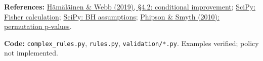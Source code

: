 \documentclass[10pt,a4paper]{article}
\begin{document}
{\footnotesize
\textbf{References:}
\href{https://link.springer.com/article/10.1007/s10618-018-0590-x}{H\"am\"al\"ainen \& Webb (2019), \S4.2: conditional improvement};
\href{https://docs.scipy.org/doc/scipy/reference/generated/scipy.stats.fisher_exact.html}{SciPy: Fisher calculation};
\href{https://docs.scipy.org/doc/scipy/reference/generated/scipy.stats.false_discovery_control.html}{SciPy: BH assumptions};
\href{https://gksmyth.github.io/pubs/PermPValuesPreprint.pdf}{Phipson \& Smyth (2010): permutation p-values}.
\par\textbf{Code:} \texttt{complex\_rules.py}, \texttt{rules.py}, \texttt{validation/*.py}. Examples verified; policy not implemented.
}
\end{document}
